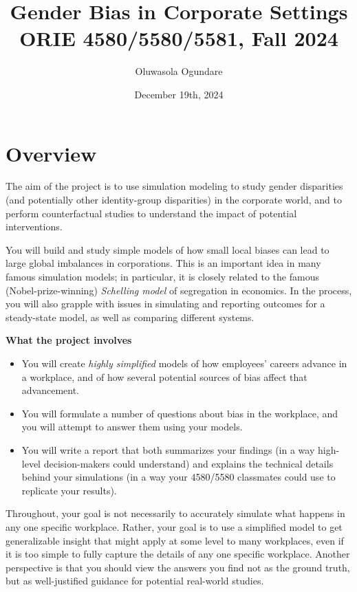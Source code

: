 \documentclass[12pt]{article}
\title{Gender Bias in Corporate Settings \\
\large ORIE 4580/5580/5581, Fall 2024}
\author{\large Oluwasola Ogundare}       %
\date{\small December 19th, 2024}
\begin{document}
\maketitle

\vspace{-1em} %

{
\small %
\tableofcontents
\vspace{\fill} %
\clearpage
}

\clearpage

\section{Overview}
The aim of the project is to use simulation modeling to study gender disparities (and potentially other identity-group disparities) in the corporate world, and to perform counterfactual studies to understand the impact of potential interventions.

You will build and study simple models of how small local biases can lead to large global imbalances in corporations. This is an important idea in many famous simulation models; in particular, it is closely related to the famous (Nobel-prize-winning) \textit{Schelling model} of segregation in economics. In the process, you will also grapple with issues in simulating and reporting outcomes for a steady-state model, as well as comparing different systems.

\textbf{What the project involves}
\begin{itemize}
    \item You will create \textit{highly simplified} models of how employees’ careers advance in a workplace, and of how several potential sources of bias affect that advancement.
    \item You will formulate a number of questions about bias in the workplace, and you will attempt to answer them using your models.
    \item You will write a report that both summarizes your findings (in a way high-level decision-makers could understand) and explains the technical details behind your simulations (in a way your 4580/5580 classmates could use to replicate your results).
\end{itemize}

Throughout, your goal is not necessarily to accurately simulate what happens in any one specific workplace. Rather, your goal is to use a simplified model to get generalizable insight that might apply at some level to many workplaces, even if it is too simple to fully capture the details of any one specific workplace. Another perspective is that you should view the answers you find not as the ground truth, but as well-justified guidance for potential real-world studies.
\end{document}
